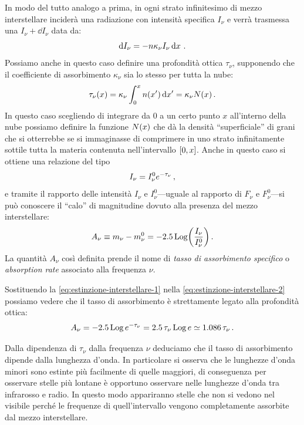        In modo del tutto analogo a prima, in ogni strato infinitesimo di mezzo interstellare inciderà una radiazione con intensità specifica $I_\nu$ e verrà trasmessa una $I_\nu + \dd{I_\nu}$ data da:
        \begin{equation}
            \dd{I_\nu} = - n\kappa_{\nu}I_{\nu}\dd{x}
            \,.
        \end{equation}
        Possiamo anche in questo caso definire una profondità ottica $\tau_\nu$, supponendo che il coefficiente di assorbimento $\kappa_\nu$ sia lo stesso per tutta la nube:
        \begin{equation*}
            \tau_\nu\pqty{x}
            = \kappa_\nu\int_{0}^{x}n\pqty{x'}\dd{x'}
            = \kappa_\nu N\pqty{x}
            \myperiod
        \end{equation*}
        In questo caso scegliendo di integrare da $0$ a un certo punto $x$ all'interno della nube possiamo definire la funzione $N\pqty{x}$ che dà la densità ``superficiale'' di grani che si otterrebbe se si immaginasse di comprimere in uno strato infinitamente sottile tutta la materia contenuta nell'intervallo $\bqty{0,x}$. Anche in questo caso si ottiene una relazione del tipo
        \begin{equation}
            \label{eq:estinzione-interstellare-1}
            I_\nu = I_\nu^0 e^{-\tau_\nu}
            \,,
        \end{equation}
        e tramite il rapporto delle intensità $I_\nu$ e $I_\nu^0$---uguale al rapporto di $F_\nu$ e $F_\nu^0$---si può conoscere il ``calo'' di magnitudine dovuto alla presenza del mezzo interstellare:
        \begin{equation}
            \label{eq:estinzione-interstellare-2}
            A_\nu
            \equiv m_\nu - m_\nu^0
            = -2.5\Log\!\pqty{\frac{I_\nu}{I_\nu^0}}
            \myperiod
        \end{equation}
        La quantità $A_\nu$ così definita prende il nome di \emph{tasso di assorbimento specifico} o \emph{absorption rate} associato alla frequenza $\nu$.

        Sostituendo la \eqref{eq:estinzione-interstellare-1} nella \eqref{eq:estinzione-interstellare-2} possiamo vedere che il tasso di assorbimento è strettamente legato alla profondità ottica:
        \begin{equation*}
            A_\nu
            = \num{-2.5}\operatorname{Log} e^{-\tau_\nu}
            = \num{2.5}\,\tau_\nu\operatorname{Log} e
            \simeq \num{1.086}\,\tau_\nu
            \,.
        \end{equation*}

        Dalla dipendenza di $\tau_\nu$ dalla frequenza $\nu$ deduciamo che il tasso di assorbimento dipende dalla lunghezza d'onda. In particolare si osserva che le lunghezze d'onda minori sono estinte più facilmente di quelle maggiori, di conseguenza per osservare stelle più lontane è opportuno osservare nelle lunghezze d'onda tra infrarosso e radio. In questo modo appariranno stelle che non si vedono nel visibile perché le frequenze di quell'intervallo vengono completamente assorbite dal mezzo interstellare.